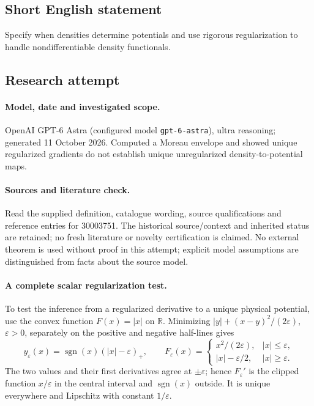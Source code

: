 \documentclass[11pt]{article}
\begin{document}
\subsection{Short English statement}
Specify when densities determine potentials and use rigorous regularization to handle nondifferentiable density functionals.
\subsection{Research attempt}
\paragraph{Model, date and investigated scope.}
OpenAI GPT-6 Astra (configured model \texttt{gpt-6-astra}), ultra reasoning; generated 11 October 2026. Computed a Moreau envelope and showed unique regularized gradients do not establish unique unregularized density-to-potential maps.

\paragraph{Sources and literature check.}
Read the supplied definition, catalogue wording, source qualifications and reference entries for 30003751. The historical source/context and inherited status are retained; no fresh literature or novelty certification is claimed. No external theorem is used without proof in this attempt; explicit model assumptions are distinguished from facts about the source model.

\paragraph{A complete scalar regularization test.} To test the inference from a regularized derivative to a unique physical potential, use the convex function \(F(x)=|x|\) on \(\mathbb R\). Minimizing \(|y|+(x-y)^2/(2\varepsilon)\), \(\varepsilon>0\), separately on the positive and negative half-lines gives
\[
 y_\varepsilon(x)=\operatorname{sgn}(x)(|x|-\varepsilon)_+,
 \qquad
 F_\varepsilon(x)=\begin{cases}x^2/(2\varepsilon),&|x|\le\varepsilon,\\|x|-\varepsilon/2,&|x|\ge\varepsilon.\end{cases}
\]
The two values and their first derivatives agree at \(\pm\varepsilon\); hence \(F_\varepsilon'\) is the clipped function \(x/\varepsilon\) in the central interval and \(\operatorname{sgn}(x)\) outside. It is unique everywhere and Lipschitz with constant \(1/\varepsilon\).
\end{document}
